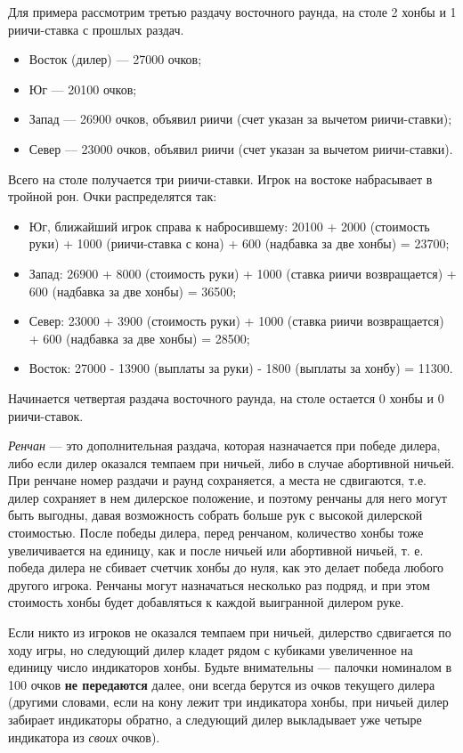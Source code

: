 Для примера рассмотрим третью раздачу восточного раунда, на столе 2 хонбы и 1 риичи-ставка с прошлых раздач.
\begin{itemize}
	\item Восток (дилер) --- 27000 очков;
	\item Юг --- 20100 очков;
	\item Запад --- 26900 очков, объявил риичи (счет указан за вычетом риичи-ставки);
	\item Север --- 23000 очков, объявил риичи (счет указан за вычетом риичи-ставки).
\end{itemize}

Всего на столе получается три риичи-ставки. Игрок на востоке набрасывает в тройной рон. Очки распределятся так:
\begin{itemize}
	\item Юг, ближайший игрок справа к набросившему: 20100 + 2000 (стоимость руки) + 1000 (риичи-ставка с кона) + 600 (надбавка за две хонбы) = 23700;
	\item Запад: 26900 + 8000 (стоимость руки) + 1000 (ставка риичи возвращается) + 600 (надбавка за две хонбы) = 36500;
	\item Север: 23000 + 3900 (стоимость руки) + 1000 (ставка риичи возвращается) + 600 (надбавка за две хонбы) = 28500;
	\item Восток: 27000 - 13900 (выплаты за руки) - 1800 (выплаты за хонбу) = 11300.
\end{itemize}

Начинается четвертая раздача восточного раунда, на столе остается 0 хонбы и 0 риичи-ставок.

\textit{Ренчан} --- это дополнительная раздача, которая назначается при победе дилера, либо если дилер оказался темпаем при ничьей, либо в случае абортивной ничьей. При ренчане номер раздачи и раунд сохраняется, а места не сдвигаются, т.е. дилер сохраняет в нем дилерское положение, и поэтому ренчаны для него могут быть выгодны, давая возможность собрать больше рук с высокой дилерской стоимостью. После победы дилера, перед ренчаном, количество хонбы тоже увеличивается на единицу, как и после ничьей или абортивной ничьей, т. е. победа дилера не сбивает счетчик хонбы до нуля, как это делает победа любого другого игрока. Ренчаны могут назначаться несколько раз подряд, и при этом стоимость хонбы будет добавляться к каждой выигранной дилером руке.

Если никто из игроков не оказался темпаем при ничьей, дилерство сдвигается по ходу игры, но следующий дилер кладет рядом с кубиками увеличенное на единицу число индикаторов хонбы. Будьте внимательны --- палочки номиналом в 100 очков \textbf{не передаются} далее, они всегда берутся из очков текущего дилера (другими словами, если на кону лежит три индикатора хонбы, при ничьей дилер забирает индикаторы обратно, а следующий дилер выкладывает уже четыре индикатора из \textit{своих} очков).

